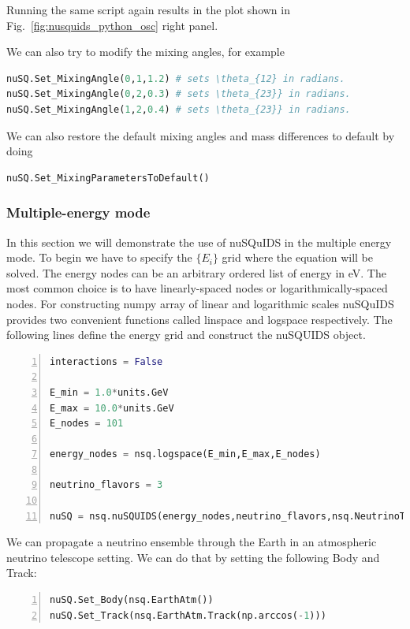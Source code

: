 \documentclass[3p,12pt]{elsarticle}
\newcommand{\ttf}{\ttfamily}
\begin{document}
Running the same script again results in the plot shown in Fig.~\ref{fig:nusquids_python_osc} right panel.

We can also try to modify the mixing angles, for example
\begin{lstlisting}[language=Python, breaklines=true]
nuSQ.Set_MixingAngle(0,1,1.2) # sets \theta_{12} in radians.
nuSQ.Set_MixingAngle(0,2,0.3) # sets \theta_{23}} in radians.
nuSQ.Set_MixingAngle(1,2,0.4) # sets \theta_{23}} in radians.
\end{lstlisting}
We can also restore the default mixing angles and mass differences to default by doing
\begin{lstlisting}[language=Python, breaklines=true]
nuSQ.Set_MixingParametersToDefault()
\end{lstlisting}

\subsubsection{Multiple-energy mode}

In this section we will demonstrate the use of {\ttf nuSQuIDS} in the multiple energy mode.
To begin we have to specify the $\{E_i\}$ grid where the equation will be solved.
The energy nodes can be an arbitrary ordered list of energy in eV.
The most common choice is to have linearly-spaced nodes or logarithmically-spaced nodes.
For constructing numpy array of linear and logarithmic scales nuSQuIDS provides two
 convenient functions called {\ttf linspace} and {\ttf logspace }respectively. The 
following lines define the energy grid and construct the nuSQUIDS object.

\begin{lstlisting}[language=Python, frame=leftline, numbers=left, breaklines=true]
interactions = False

E_min = 1.0*units.GeV
E_max = 10.0*units.GeV
E_nodes = 101

energy_nodes = nsq.logspace(E_min,E_max,E_nodes)

neutrino_flavors = 3

nuSQ = nsq.nuSQUIDS(energy_nodes,neutrino_flavors,nsq.NeutrinoType.neutrino,interactions)
\end{lstlisting}

We can propagate a neutrino ensemble through the Earth in an atmospheric neutrino telescope setting.
We can do that by setting the following Body and Track:

\begin{lstlisting}[language=Python, frame=leftline, numbers=left, breaklines=true]
nuSQ.Set_Body(nsq.EarthAtm())
nuSQ.Set_Track(nsq.EarthAtm.Track(np.arccos(-1)))
\end{lstlisting}
\end{document}
